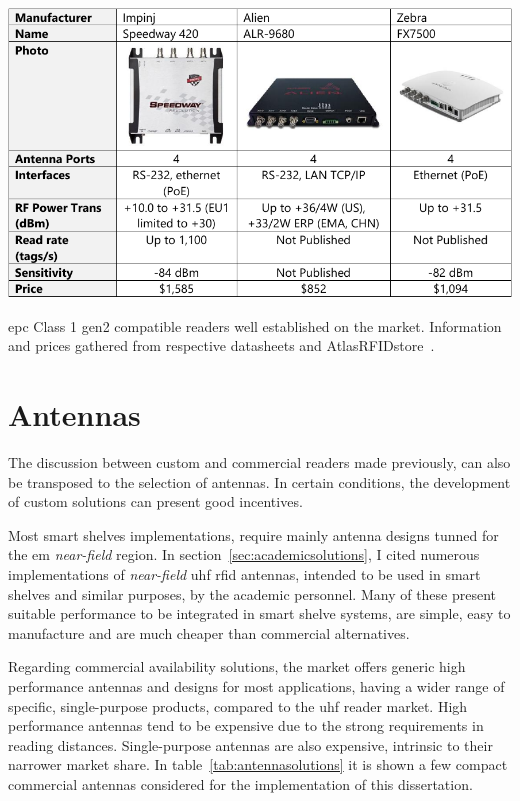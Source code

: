 \begin{table}
    \centering
    \includegraphics[width=\linewidth]{./figs/02-state-of-the-art/table_commercialreaders.pdf}
    \caption[\ac{epc} Class 1 \ac{gen2} compatible readers well established on the market]{\ac{epc} Class 1 \ac{gen2} compatible readers well established on the market. Information and prices gathered from respective datasheets and AtlasRFIDstore~\cite{AtlasRFIDstoreBuyRFID}.}
    \label{tab:readercommercialsolutions}
\end{table}


\section{Antennas}

The discussion between custom and commercial readers made previously, can also be transposed to the selection of antennas. In certain conditions, the development of custom solutions can present good incentives.

Most smart shelves implementations, require mainly antenna designs tunned for the \ac{em} \emph{near-field} region.
In section~\ref{sec:academicsolutions}, I cited numerous implementations of \emph{near-field} \ac{uhf} \ac{rfid} antennas, intended to be used in smart shelves and similar purposes, by the academic personnel. Many of these present suitable performance to be integrated in smart shelve systems, are simple, easy to manufacture and are much cheaper than commercial alternatives. 

Regarding commercial availability solutions, the market offers generic high performance antennas and designs for most applications, having a wider range of specific, single-purpose products, compared to the \ac{uhf} reader market. 
High performance antennas tend to be expensive due to the strong requirements in reading distances. Single-purpose antennas are also expensive, intrinsic to their narrower market share. 
In table~\ref{tab:antennasolutions} it is shown a few compact commercial antennas considered for the implementation of this dissertation.

